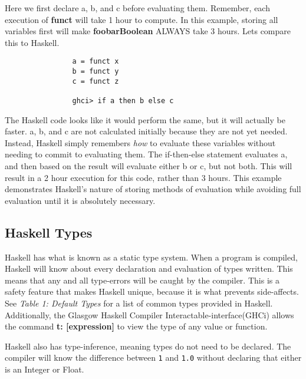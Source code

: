 \documentclass{article}
\begin{document}
            
            \medskip\noindent
            Here we first declare a, b, and c before evaluating them. Remember, each execution of \textbf{funct} will take 1 hour to compute. In this example, storing all variables first will make \textbf{foobarBoolean} ALWAYS take 3 hours. Lets compare this to Haskell.            
            \begin{lstlisting}
                a = funct x
                b = funct y
                c = funct z
                
                ghci> if a then b else c
            \end{lstlisting}
            
            \medskip\noindent
            The Haskell code looks like it would perform the same, but it will actually be faster. a, b, and c are not calculated initially because they are not yet needed. Instead, Haskell simply remembers \textit{how} to evaluate these variables without needing to commit to evaluating them. The if-then-else statement evaluates a, and then based on the result will evaluate either b or c, but not both. This will result in a 2 hour execution for this code, rather than 3 hours. This example demonstrates Haskell's nature of storing methods of evaluation while avoiding full evaluation until it is absolutely necessary.
    
    \subsection{Haskell Types}
        Haskell has what is known as a static type system. When a program is compiled, Haskell will know about every declaration and evaluation of types written. This means that any and all type-errors will be caught by the compiler. This is a safety feature that makes Haskell unique, because it is what prevents side-affects. See \textit{Table 1: Default Types} for a list of common types provided in Haskell. Additionally, the Glasgow Haskell Compiler Interactable-interface(GHCi) allows the command \textbf{t: [expression]} to view the type of any value or function.
        
        \medskip\noindent 
        Haskell also has type-inference, meaning types do not need to be declared. The compiler will know the difference between \lstinline{1} and \lstinline{1.0} without declaring that either is an Integer or Float. 
        
\end{document}
